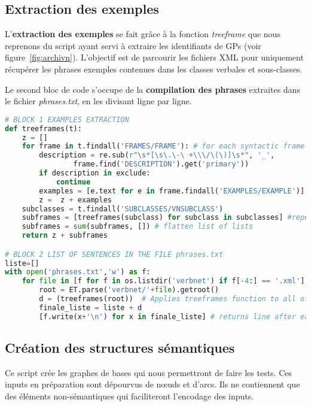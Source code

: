 \subsection{Extraction des exemples}

L'\textbf{extraction des exemples} se fait grâce à la fonction \emph{treeframe} que nous reprenons du script ayant servi à extraire les identifiants de \acp{GP} (voir figure~\ref{fig:archivn}). L'objectif est de parcourir les fichiers XML pour uniquement récupérer les phrases exemples contenues dans les classes verbales et sous-classes.

Le second bloc de code s'occupe de la \textbf{compilation des phrases} extraites dans le fichier \emph{phrases.txt}, en les divisant ligne par ligne. 

\begin{lstlisting}[language=Python, caption = Extraction des phrases exemples de VerbNet]
# BLOCK 1 EXAMPLES EXTRACTION
def treeframes(t):
    z = []
    for frame in t.findall('FRAMES/FRAME'): # for each syntactic frame
        description = re.sub(r"\s*[\s\.\-\ +\\\/\(\)]\s*", '_',
				frame.find('DESCRIPTION').get('primary'))
        if description in exclude:
            continue    
        examples = [e.text for e in frame.findall('EXAMPLES/EXAMPLE')] # get the examples
        z =  z + examples 
    subclasses = t.findall('SUBCLASSES/VNSUBCLASS')
    subframes = [treeframes(subclass) for subclass in subclasses] #repeat operation for subclasses
    subframes = sum(subframes, []) # flatten list of lists
    return z + subframes

# BLOCK 2 LIST OF SENTENCES IN THE FILE phrases.txt
liste=[]
with open('phrases.txt','w') as f:
    for file in [f for f in os.listdir('verbnet') if f[-4:] == '.xml']:
        root = ET.parse('verbnet/'+file).getroot()       
        d = (treeframes(root))  # Applies treeframes function to all of VerbNet files
        finale_liste = liste + d
        [f.write(x+'\n') for x in finale_liste] # returns line after each example

\end{lstlisting}

\subsection{Création des structures sémantiques}\label{sec:pythonstruc}

Ce script crée les graphes de bases qui nous permettront de faire les tests. Ces inputs en préparation sont dépourvus de n\oe{}uds et d'arcs. Ils ne contiennent que des éléments non-sémantiques qui faciliteront l'encodage des inputs.

